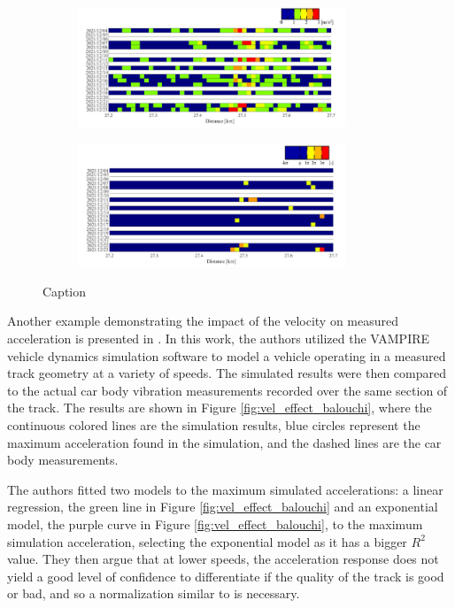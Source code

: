 \begin{figure}[H]
    \centering
    \begin{subfigure}{0.45\textwidth}
        \includegraphics[width=8cm]{Cap2_LitReview/Vel_effect/before_correction.png}
        \caption{\cite{Hironori_ONO202322-00239}}
        \label{fig:vel_correction_ono-a}
    \end{subfigure}
    \hspace{0.3cm}
    \begin{subfigure}{0.45\textwidth}
        \includegraphics[width=8cm]{Cap2_LitReview/Vel_effect/after_correction.png}
        \caption{\cite{Hironori_ONO202322-00239}}
        \label{fig:vel_correction_ono-b}
    \end{subfigure}
    \caption{Caption}
    \label{fig:vel_correction_ono}
\end{figure}

Another example demonstrating the impact of the velocity on measured acceleration is presented in \cite{Balouchi02092021}. In this work, the authors utilized the VAMPIRE vehicle dynamics simulation software to model a vehicle operating in a measured track geometry at a variety of speeds. The simulated results were then compared to the actual car body vibration measurements recorded over the same section of the track. The results are shown in Figure \ref{fig:vel_effect_balouchi}, where the continuous colored lines are the simulation results, blue circles represent the maximum acceleration found in the simulation, and the dashed lines are the car body measurements. 

The authors fitted two models to the maximum simulated accelerations: a linear regression, the green line in Figure \ref{fig:vel_effect_balouchi} and an exponential model, the purple curve in Figure \ref{fig:vel_effect_balouchi}, to the maximum simulation acceleration, selecting the exponential model as it has a bigger $R^2$ value. They then argue that at lower speeds, the acceleration response does not yield a good level of confidence to differentiate if the quality of the track is good or bad, and so a normalization similar to \cite{Hironori_ONO202322-00239} is necessary.

